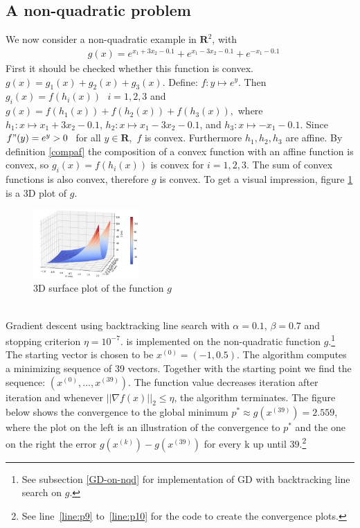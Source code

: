 \subsection{A non-quadratic problem}
We now consider a non-quadratic example in $\mathbf{R}^2$,  with 
\begin{equation*}\label{eq:12}\tag{5.2.1}
\begin{aligned}  
    &g(x) = e^{x_{1}+3x_{2}-0.1}+e^{x_{1}-3x_{2}-0.1}+e^{-x_{1}-0.1}
\end{aligned}
\end{equation*}
First it should be checked whether this function is convex. $g(x) = g_{1}(x)  + g_{2}(x) + g_{3}(x).$ Define: $f: y \mapsto e^{y}$. Then $g_{i}(x) = f(h_{i}(x)) \text{ } i=1,2,3$ and $g(x) = f(h_{1}(x)) + f(h_{2}(x)) + f(h_{3}(x)) ,$ where $h_{1}: x \mapsto x_{1} + 3x_{2}-0.1$, $h_{2}: x \mapsto x_{1} - 3x_{2}-0.1$, and $h_{3}: x \mapsto -x_{1}-0.1$. Since $f"(y) = e^{y} > 0 \text{ }$ for all $y \in \mathbf{R},$ $f$ is convex. Furthermore $h_{1}, h_{2}, h_{3}$ are affine. By definition \ref{compaf} the composition of a convex function with an affine function is convex, so $g_{i}(x) = f(h_{i}(x))$ is convex for $i=1,2,3.$ The sum of convex functions is also convex, therefore $g$ is convex. To get a visual impression, figure \ref{fig:exp} is a 3D plot of $g.$
\begin{figure}[h!]
    \centering
        \includegraphics[width=0.36\textwidth]{Pictures/3D plot of an exponential function.png}
    \caption{3D surface plot of the function $g$}\label{fig:exp}
\end{figure}\\
Gradient descent using backtracking line search with $\alpha = 0.1$, $\beta = 0.7$ and stopping criterion $\eta = 10^{-7}.$ is implemented on the non-quadratic function $g$.\footnote{See subsection \ref{GD-on-nqd} for implementation of GD with backtracking line search on $g$.} The starting vector is chosen to be $x^{(0)} = (-1,0.5)$. The algorithm computes a minimizing sequence of 39 vectors. Together with the starting point we find the sequence: $(x^{(0)},\ldots,x^{(39)}).$ The function value decreases iteration after iteration and whenever $||\nabla f(x)||_{2} \leq \eta$, the algorithm terminates. The figure below shows the convergence to the global minimum $p^{*} \approx g(x^{(39)})=2.559$, where the plot on the left is an illustration of the convergence to $p^{*}$ and the one on the right the error $g(x^{(k)}) - g(x^{(39)})$ for every k up until 39.\footnote{See line~\ref{line:p9} to~\ref{line:p10} for the code to create the convergence plots.} 
